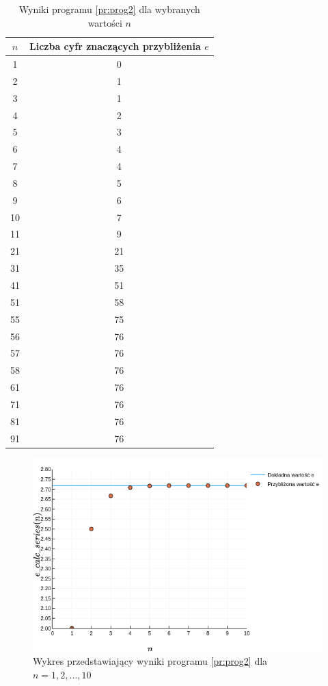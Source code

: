 \documentclass[12pt]{article}
\begin{document}
\begin{table}[H]
\centering
\begin{tabular}{|c|c|}
    \hline
    \large$n$ & \large Liczba cyfr znaczących przybliżenia $e$\normalsize\\
    \hline
    1   &  0  \\ \hline
    2   &  1  \\ \hline
    3   &  1  \\ \hline
    4   &  2  \\ \hline
    5   &  3  \\ \hline
    6   &  4  \\ \hline
    7   &  4  \\ \hline
    8   &  5  \\ \hline
    9   &  6  \\ \hline
    10  &  7  \\ \hline
    11  &  9  \\ \hline
    21  &  21 \\ \hline
    31  &  35 \\ \hline
    41  &  51 \\ \hline
    51  &  58 \\ \hline
    55  &  75 \\ \hline
    56  &  76 \\ \hline
    57  &  76 \\ \hline
    58  &  76 \\ \hline
    61  &  76 \\ \hline
    71  &  76 \\ \hline
    81  &  76 \\ \hline
    91  &  76 \\ \hline
\end{tabular}
\caption{Wyniki programu \ref{pr:prog2} dla wybranych wartości $n$}
\label{table:prog2}
\end{table}

\begin{figure}[H]
    \centering
    \includegraphics[scale=0.75]{plot2.png}
\caption{Wykres przedstawiający wyniki programu \ref{pr:prog2} dla $n = 1, 2, ..., 10$}
\label{figure:fig2}
\end{figure}
\end{document}
